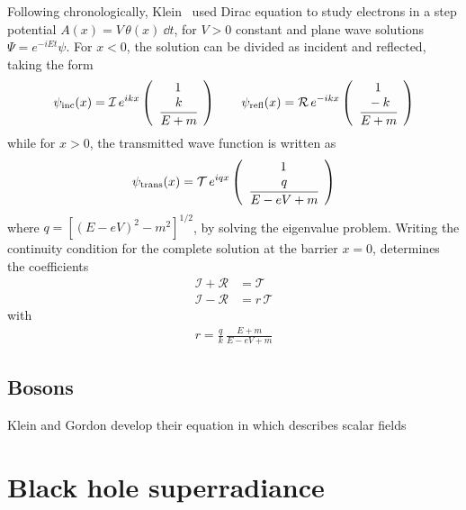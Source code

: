 Following chronologically, Klein~\cite{Klein1929} used Dirac equation to study electrons in a step potential $A(x) = V\,\theta(x) ~\dd t$, for $V>0$ constant and plane wave solutions $\Psi= e^{-i E t} \psi$. For $x<0$, the solution can be divided as incident and reflected, taking the form
\begin{align}
    \psi_\mathrm{inc}(x) = \mathcal{I}\, e^{i k x} \left(\begin{array}{c} 1 \\ \cfrac{k}{E+m} \end{array}\right) \qquad
    \psi_\mathrm{refl}(x) = \mathcal{R}\, e^{- i k x} \left(\begin{array}{c} 1 \\ \cfrac{-k}{E+m} \end{array}\right)
\end{align}
while for $x>0$, the transmitted wave function is written as 
\begin{align}
    \psi_\mathrm{trans}(x) = \mathcal{T}\, e^{i q x} \left(\begin{array}{c} 1 \\ \cfrac{q}{ E - e V + m} \end{array}\right)
\end{align}
where $q = [(E-e V)^2 - m^2]^{1/2}$, by solving the eigenvalue problem. 
Writing the continuity condition for the complete solution at the barrier $x=0$, determines the coefficients
\begin{align}
    \mathcal{I} + \mathcal{R} &= \mathcal{T} \\
    \mathcal{I} - \mathcal{R} &= r\, \mathcal{T}
\end{align}
with
\begin{align}
    r = \frac{q}{k}\,\frac{E+m}{E-e V+m}
\end{align}




\subsection{Bosons}

Klein and Gordon develop their equation in which describes scalar fields



\section{Black hole superradiance}




\cleardoublepage
